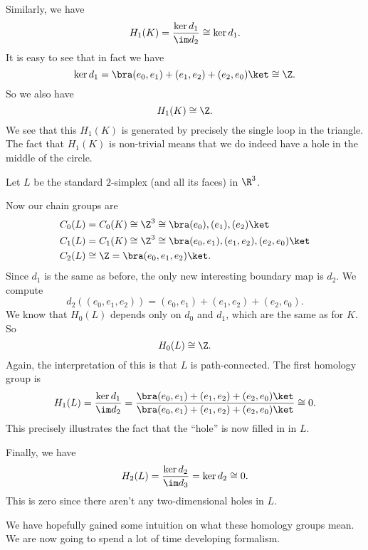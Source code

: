 \documentclass[a4paper]{article}
\begin{document}
\begin{eg}
  Similarly, we have
  \[
    H_1(K) = \frac{\ker d_1}{\im d_2} \cong \ker d_1.
  \]
  It is easy to see that in fact we have
  \[
    \ker d_1 = \bra (e_0, e_1) + (e_1, e_2) + (e_2, e_0)\ket \cong \Z.
  \]
  So we also have
  \[
    H_1(K) \cong \Z.
  \]
  We see that this $H_1(K)$ is generated by precisely the single loop in the triangle. The fact that $H_1(K)$ is non-trivial means that we do indeed have a hole in the middle of the circle.
\end{eg}

\begin{eg}
  Let $L$ be the standard $2$-simplex (and all its faces) in $\R^3$.
   \begin{center}
  \end{center}
  Now our chain groups are
  \begin{align*}
    C_0(L) &= C_0(K) \cong \Z^3 \cong \bra (e_0), (e_1), (e_2)\ket\\
    C_1(L) &= C_1(K) \cong \Z^3 \cong \bra (e_0, e_1), (e_1, e_2), (e_2, e_0)\ket\\
    C_2(L) &\cong \Z = \bra (e_0, e_1, e_2)\ket.
  \end{align*}
  Since $d_1$ is the same as before, the only new interesting boundary map is $d_2$. We compute
  \[
    d_2 ((e_0, e_1, e_2)) = (e_0, e_1) + (e_1, e_2) + (e_2, e_0).
  \]
  We know that $H_0(L)$ depends only on $d_0$ and $d_1$, which are the same as for $K$. So
  \[
    H_0(L) \cong \Z.
  \]
  Again, the interpretation of this is that $L$ is path-connected. The first homology group is
  \[
    H_1(L) = \frac{\ker d_1}{\im d_2} = \frac{\bra (e_0, e_1) + (e_1, e_2) + (e_2, e_0) \ket}{\bra (e_0, e_1) + (e_1, e_2) + (e_2, e_0) \ket} \cong 0.
  \]
  This precisely illustrates the fact that the ``hole'' is now filled in in $L$.

  Finally, we have
  \[
    H_2(L) = \frac{\ker d_2}{\im d_3} = \ker d_2 \cong 0.
  \]
  This is zero since there aren't any two-dimensional holes in $L$.
\end{eg}
We have hopefully gained some intuition on what these homology groups mean. We are now going to spend a lot of time developing formalism.
\end{document}
